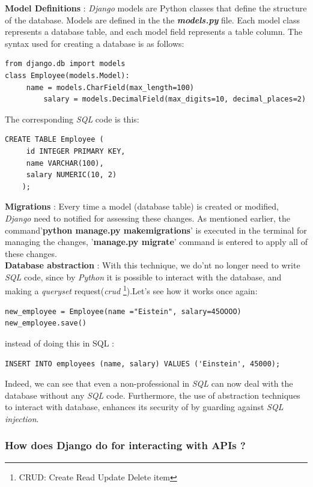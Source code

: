 \documentclass[12pt,a4paper, oneside]{book}
\begin{document}
\textbf{Model Definitions} : \textit{Django} models are Python classes that define the structure of the database. Models are defined in the the \textbf{\textit{models.py}} file. Each model class represents a database table, and each model field represents a table column. The syntax used for creating a database is as follows: 
\begin{lstlisting}[style=stylejupyter]
from django.db import models
class Employee(models.Model):
     name = models.CharField(max_length=100)
	     salary = models.DecimalField(max_digits=10, decimal_places=2)
\end{lstlisting} 
The corresponding \textit{SQL} code is this:  
\begin{lstlisting}[style=htmlcssjsstyle]
	CREATE TABLE Employee (
	 id INTEGER PRIMARY KEY,
	 name VARCHAR(100),
	 salary NUMERIC(10, 2)
	);
\end{lstlisting}  

 \textbf{Migrations} : Every time a model (database table) is created or modified, \textit{Django} need to notified for assessing these changes. As mentioned earlier, the command'\textbf{python manage.py makemigrations}' is executed in the terminal for managing the changes,  '\textbf{manage.py migrate}' command is entered to apply all of these changes.   \\
 
\textbf{Database abstraction} : With this technique, we do'nt no longer need to write \textit{SQL} code, since by \textit{Python} it is possible to interact with the database, and making a \textit{queryset} request(\textit{crud}  \footnote{CRUD: Create Read Update Delete item}).Let's see how it works once again: 

\begin{lstlisting}[style=stylejupyter]
new_employee = Employee(name ="Eistein", salary=45OOOO) 
new_employee.save()
\end{lstlisting} 
instead of doing this in SQL : 
\begin{lstlisting}[style=htmlcssjsstyle]
INSERT INTO employees (name, salary) VALUES ('Einstein', 45000);
\end{lstlisting}  

Indeed, we can see that even a non-professional in \textit{SQL} can now deal with the database without any \textit{SQL} code. \newline
Furthermore, the use of abstraction techniques to interact with database, enhances its security of by guarding against \textit{SQL injection}. 
\subsubsection{How does Django do for interacting with APIs ?}
\end{document}
